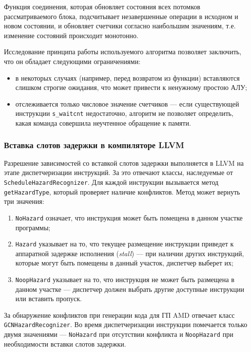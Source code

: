 \documentclass[a4paper,14pt]{extarticle}
\newenvironment{ul}{\begin{itemize}[noitemsep,topsep=0em]}{\end{itemize}\vspace{4mm}}
\newenvironment{ol}{\begin{enumerate}[noitemsep,topsep=0em]}{\end{enumerate}\vspace{4mm}}
\begin{document}
Функция соединения, которая обновляет состояния всех потомков рассматриваемого блока,
подсчитывает незавершенные операции в исходном и новом состоянии, и обновляет
счетчики согласно наибольшим значениям, т.е. изменение состояний происходит монотонно.

Исследование принципа работы используемого алгоритма позволяет заключить, что он обладает
следующими ограничениями:
\begin{ul}
\item в некоторых случаях (например, перед возвратом из функции) вставляются слишком
  строгие ожидания, что может привести к ненужному простою АЛУ;
\item отслеживается только числовое значение счетчиков — если существующей инструкции
  \texttt{s\_waitcnt} недостаточно, алгоритм не позволяет определить, какая команда
  совершила неучтенное обращение к памяти.
\end{ul}

\subsubsection{Вставка слотов задержки в компиляторе LLVM}

Разрешение зависимостей со вставкой слотов задержки выполняется в LLVM на этапе
диспетчеризации инструкций. За это отвечают классы, наследуемые от \texttt{ScheduleHazardRecognizer}.
Для каждой инструкции вызывается метод \texttt{getHazardType}, который проверяет наличие
конфликтов. Метод может вернуть три значения:
\begin{ol}
\item \texttt{NoHazard} означает, что инструкция может быть помещена в данном участке программы;
\item \texttt{Hazard} указывает на то, что текущее размещение инструкции приведет к аппаратной
  задержке исполнения (\textit{stall}) — при наличии других инструкций, которые
  могут быть помещены в данный участок, диспетчер выберет их;
\item \texttt{NoopHazard} указывает на то, что инструкция не может быть размещена в данном
  участке — диспетчер должен выбрать другие доступные инструкции или вставить пропуск.
\end{ol}

За обнаружение конфликтов при генерации кода для ГП AMD отвечает класс \texttt{GCNHazardRecognizer}.
Во время диспетчеризации инструкции помечается только двумя значениями — \texttt{NoHazard} при
отсутствии конфликта и \texttt{NoopHazard} при необходимости вставки слотов задержки.
\end{document}
